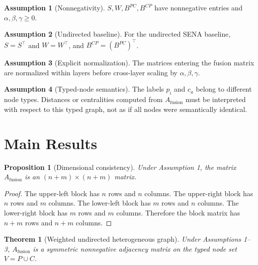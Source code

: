 \documentclass[11pt]{article}
\newtheorem{theorem}{Theorem}
\newtheorem{proposition}{Proposition}
\theoremstyle{definition}
\newtheorem{assumption}{Assumption}
\newcommand{\Af}{A_{\mathrm{fusion}}}
\newcommand{\Smat}{S}
\newcommand{\Wmat}{W}
\begin{document}
\begin{assumption}[Nonnegativity]
\(\Smat,\Wmat,B^{PC},B^{CP}\) have nonnegative entries and
\(\alpha,\beta,\gamma\ge 0\).
\end{assumption}

\begin{assumption}[Undirected baseline]
For the undirected SENA baseline, \(\Smat=\Smat^\top\) and
\(\Wmat=\Wmat^\top\), and \(B^{CP}=(B^{PC})^\top\).
\end{assumption}

\begin{assumption}[Explicit normalization]
The matrices entering the fusion matrix are normalized within layers
before cross-layer scaling by \(\alpha,\beta,\gamma\).
\end{assumption}

\begin{assumption}[Typed-node semantics]
The labels \(p_i\) and \(c_a\) belong to different node types. Distances or
centralities computed from \(\Af\) must be interpreted with respect to this
typed graph, not as if all nodes were semantically identical.
\end{assumption}

\section{Main Results}

\begin{proposition}[Dimensional consistency]
Under Assumption 1, the matrix \(\Af\) is an
\((n+m)\times(n+m)\) matrix.
\end{proposition}

\begin{proof}
The upper-left block has \(n\) rows and \(n\) columns. The upper-right block has
\(n\) rows and \(m\) columns. The lower-left block has \(m\) rows and \(n\)
columns. The lower-right block has \(m\) rows and \(m\) columns. Therefore the
block matrix has \(n+m\) rows and \(n+m\) columns.
\end{proof}

\begin{theorem}[Weighted undirected heterogeneous graph]
Under Assumptions 1--3, \(\Af\) is a symmetric nonnegative adjacency matrix on
the typed node set \(V=P\cup C\).
\end{theorem}
\end{document}
